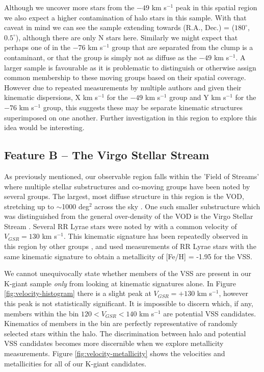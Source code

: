 \documentclass{emulateapj}
\begin{document}
		Although we uncover more stars from the $-49$ km s$^{-1}$ peak in this spatial region we also expect a higher contamination of halo stars in this sample. With that caveat in mind we can see the sample extending towards (R.A., Dec.) = ($180^\circ$, $0.5^\circ$), although there are only N stars here. Similarly we might expect that perhaps one of in the $-76$ km s$^{-1}$ group that are separated from the clump is a contaminant, or that the group is simply not as diffuse as the $-49$ km s$^{-1}$. A larger sample is favourable as it is problematic to distinguish or otherwise assign common membership to these moving groups based on their spatial coverage. However due to repeated measurements by multiple authors and given their kinematic dispersions, X km s$^{-1}$ for the $-49$ km s$^{-1}$ group and Y km s$^{-1}$ for the $-76$ km s$^{-1}$ group, this suggests these may be separate kinematic structures superimposed on one another. Further investigation in this region to explore this idea would be interesting.
			
			

	\subsection{Feature B \--- The Virgo Stellar Stream}
	\label{sec:the-vss}
	
	As previously mentioned, our observable region falls within the 'Field of Streams' where multiple stellar substructures and co-moving groups have been noted by several groups. The largest, most diffuse structure in this region is the VOD, stretching up to $\sim$1000 deg$^2$ across the sky \citep{Juric;et-al_2008}. One such smaller substructure which was distinguished from the general over-density of the VOD is the Virgo Stellar Stream \citep{Duffau;et-al_2006}. Several RR Lyrae stars were noted by \citet{Prior;et-al_2009a} with a common velocity of $V_{GSR} = 130$ km s$^{-1}$. This kinematic signature has been repeatedly observed in this region by other groups \citep{Newberg;et-al_2007, Prior;et-al_2009a}, and \citet{Prior;et-al_2009a} used measurements of RR Lyrae stars with the same kinematic signature to obtain a metallicity of [Fe/H] = -1.95 for the VSS. 
	
	
	We cannot unequivocally state whether members of the VSS are present in our K-giant sample \textit{only} from looking at kinematic signatures alone. In Figure \ref{fig:velocity-histogram} there is a slight peak at $V_{GSR} = +130$ km s$^{-1}$, however this peak is not statistically significant. It is impossible to discern which, if any, members within the bin $120 < V_{GSR} < 140$ km s$^{-1}$ are potential VSS candidates. Kinematics of members in the bin are perfectly representative of randomly selected stars within the halo. The discrimination between halo and potential VSS candidates becomes more discernible when we explore metallicity measurements. Figure \ref{fig:velocity-metallicity} shows the velocities and metallicities for all of our K-giant candidates. %
	
\end{document}
